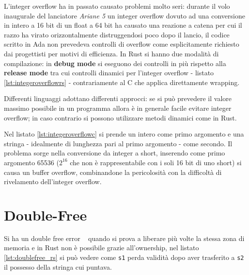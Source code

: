 \documentclass[Lau,binding=0.6cm]{sapthesis}
\begin{document}
L'integer overflow ha in passato causato problemi molto seri: durante il volo inaugurale del lanciatore \textit{Ariane 5} un integer overflow dovuto ad una conversione in intero a 16 bit di un float a 64 bit ha causato una reazione a catena per cui il razzo ha virato orizzontalmente distruggendosi poco dopo il lancio, il codice scritto in Ada non prevedeva controlli di overflow come esplicitamente richiesto dai progettisti per motivi di efficienza. In Rust si hanno due modalità di compilazione: in \textbf{debug mode} si eseguono dei controlli in più rispetto alla \textbf{release mode} tra cui controlli dinamici per l'integer overflow - listato \ref{lst:integeroverflowrs} - contrariamente al C che applica direttamente wrapping.

Differenti linguaggi adottano differenti approcci: se si può prevedere il valore massimo possibile in un programma allora è in generale facile evitare integer overflow; in caso contrario si possono utilizzare metodi dinamici come in Rust. 




Nel listato \ref{lst:integeroverflowc} si prende un intero come primo argomento e una stringa - idealmente di lunghezza pari al primo argomento - come secondo. Il problema sorge nella conversione da integer a short, inserendo come primo argomento 65536 ($2^{16}$ che non è rappresentabile con i soli 16 bit di uno short) si causa un buffer overflow, combinandone la pericolosità con la difficoltà di rivelamento dell'integer overflow.




\section{Double-Free} \label{sec:double_free}
Si ha un double free error ~\cite[10.4.4]{gollmann:computersecurity} quando si prova a liberare più volte la stessa zona di memoria e in Rust non è possibile grazie all'ownership, nel listato \ref{lst:doublefree_rs} si può vedere come \texttt{s1} perda validità dopo aver trasferito a \texttt{s2} il possesso della stringa cui puntava.



\end{document}
